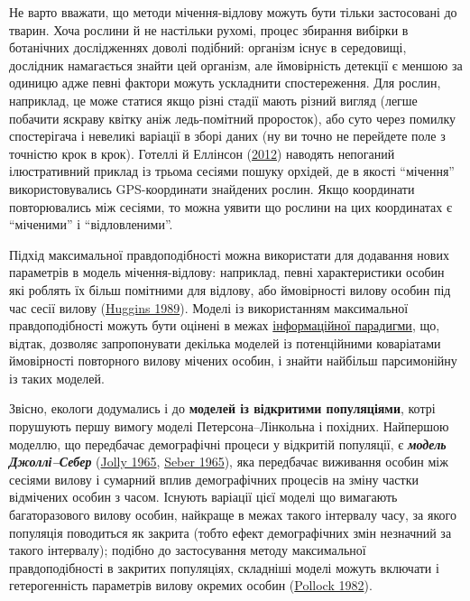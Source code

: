 \documentclass[
  11pt,
]{book}
\begin{document}
Не варто вважати, що методи мічення-відлову можуть бути тільки застосовані до тварин. Хоча рослини й не настільки рухомі, процес збирання вибірки в ботанічних дослідженнях доволі подібний: організм існує в середовищі, дослідник намагається знайти цей організм, але ймовірність детекції є меншою за одиницю адже певні фактори можуть ускладнити спостереження. Для рослин, наприклад, це може статися якщо різні стадії мають різний вигляд (легше побачити яскраву квітку аніж ледь-помітний проросток), або суто через помилку спостерігача і невеликі варіації в зборі даних (ну ви точно не перейдете поле з точністю крок в крок). Готеллі й Еллінсон (\href{https://global.oup.com/academic/product/a-primer-of-ecological-statistics-9781605350646?cc=us&lang=en&}{2012}) наводять непоганий ілюстративний приклад із трьома сесіями пошуку орхідей, де в якості ``мічення'' використовувались GPS-координати знайдених рослин. Якщо координати повторювались між сесіями, то можна уявити що рослини на цих координатах є ``міченими'' і ``відловленими''.

Підхід максимальної правдоподібності можна використати для додавання нових параметрів в модель мічення-відлову: наприклад, певні характеристики особин які роблять їх більш помітними для відлову, або ймовірності вилову особин під час сесії вилову (\href{https://doi.org/10.1093/biomet/76.1.133}{Huggins 1989}). Моделі із використанням максимальної правдоподібності можуть бути оцінені в межах \hyperref[aic]{інформаційної парадигми}, що, відтак, дозволяє запропонувати декілька моделей із потенційними коваріатами ймовірності повторного вилову мічених особин, і знайти найбільш парсимонійну із таких моделей.

Звісно, екологи додумались і до \textbf{моделей із відкритими популяціями}, котрі порушують першу вимогу моделі Петерсона--Лінкольна і похідних. Найпершою моделлю, що передбачає демографічні процеси у відкритій популяції, є \textbf{\emph{модель Джоллі--Себер}} (\href{https://doi.org/10.1093/biomet/52.1-2.225}{Jolly 1965}, \href{https://doi.org/10.1093/biomet/52.1-2.249}{Seber 1965}), яка передбачає виживання особин між сесіями вилову і сумарний вплив демографічних процесів на зміну частки відмічених особин з часом. Існують варіації цієї моделі що вимагають багаторазового вилову особин, найкраще в межах такого інтервалу часу, за якого популяція поводиться як закрита (тобто ефект демографічних змін незначний за такого інтервалу); подібно до застосування методу максимальної правдоподібності в закритих популяціях, складніші моделі можуть включати і гетерогенність параметрів вилову окремих особин (\href{https://doi.org/10.2307/3808568}{Pollock 1982}).
\end{document}
